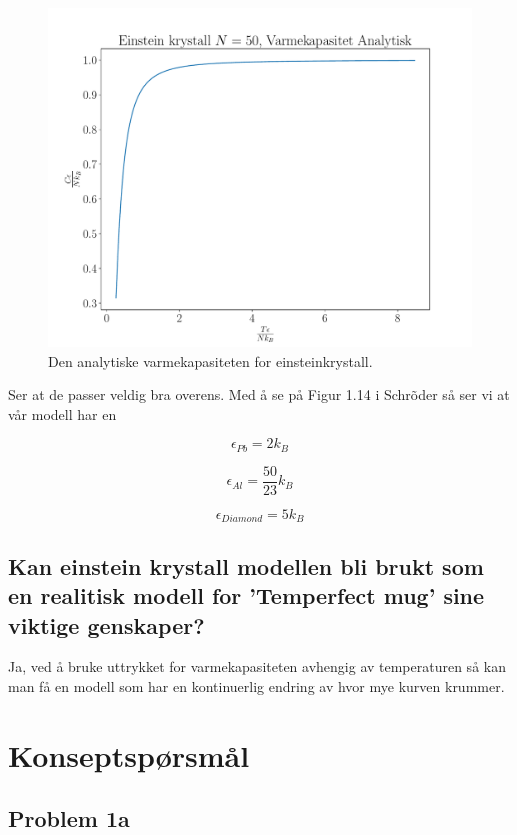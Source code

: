 \documentclass[ reprint, amsmath,amssymb, aps]{revtex4-2}
\begin{document}
\begin{figure}
\centering
\includegraphics[scale=0.35]{Vanalytisk.pdf}
\caption{Den analytiske varmekapasiteten for einsteinkrystall.}
\label{Vanalytisk}
\end{figure}

Ser at de passer veldig bra overens. Med å se på Figur 1.14 i Schrõder så ser vi at vår modell har en 

$$\epsilon_{Pb} = 2k_B$$

$$\epsilon_{Al} = \frac{50}{23} k_B$$

$$\epsilon_{Diamond} = 5 k_B$$

\subsection*{Kan einstein krystall modellen bli brukt som en realitisk modell for 'Temperfect mug' sine viktige genskaper?}

Ja, ved å bruke uttrykket for varmekapasiteten avhengig av temperaturen så kan man få en modell som har en kontinuerlig endring av hvor mye kurven krummer. 

\section*{Konseptspørsmål}

\subsection*{Problem 1a}
\end{document}
